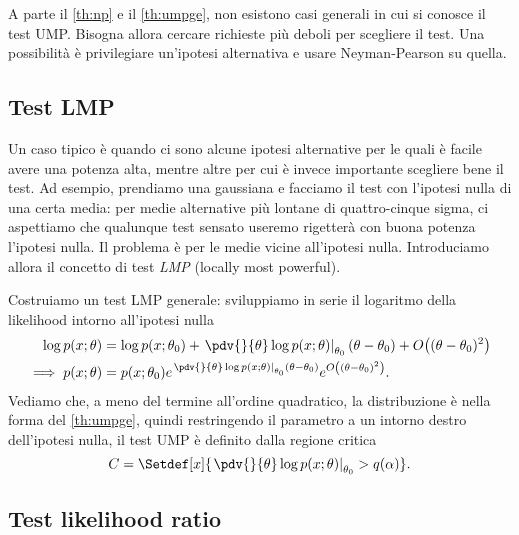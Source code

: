 
A parte il \autoref{th:np} e il \autoref{th:umpge},
non esistono casi generali in cui si conosce il test UMP.
Bisogna allora cercare richieste più deboli per scegliere il test.
Una possibilità è privilegiare un'ipotesi alternativa
e usare Neyman-Pearson su quella.

\subsection{Test LMP}

Un caso tipico è quando ci sono alcune ipotesi alternative
per le quali è facile avere una potenza alta,
mentre altre per cui è invece importante scegliere bene il test.
Ad esempio, prendiamo una gaussiana e facciamo il test con l'ipotesi nulla di una certa media:
per medie alternative più lontane di quattro-cinque sigma,
ci aspettiamo che qualunque test sensato useremo rigetterà con buona potenza l'ipotesi nulla.
Il problema è per le medie vicine all'ipotesi nulla.
Introduciamo allora il concetto di test \emph{LMP} (locally most powerful).

Costruiamo un test LMP generale:
sviluppiamo in serie il logaritmo della likelihood intorno all'ipotesi nulla
\begin{align*}
	\log p(x;\theta)
	&= \log p(x;\theta_0)
	+ \left.\pdv{}{\theta} \log p(x;\theta)\right|_{\theta_0} (\theta-\theta_0)
	+ O\big((\theta-\theta_0)^2\big) \\
	\implies p(x;\theta)
	&= p(x;\theta_0)
	e^{\left.\pdv{}{\theta} \log p(x;\theta)\right|_{\theta_0} (\theta-\theta_0)}
	e^{O\left((\theta-\theta_0)^2\right)}.
\end{align*}
Vediamo che, a meno del termine all'ordine quadratico,
la distribuzione è nella forma del \autoref{th:umpge},
quindi restringendo il parametro a un intorno destro dell'ipotesi nulla,
il test UMP è definito dalla regione critica
\begin{equation*}
	C = \Setdef[x]{\left.\pdv{}{\theta} \log p(x;\theta)\right|_{\theta_0} > q(\alpha)}.
\end{equation*}

\subsection{Test likelihood ratio}

